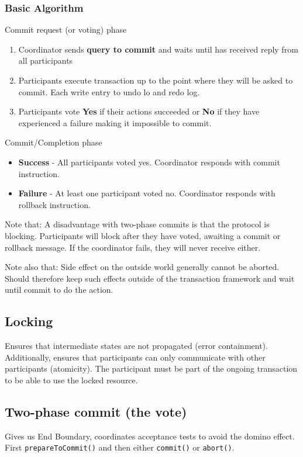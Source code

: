 \subsubsection{Basic Algorithm}
Commit request (or voting) phase 
\begin{enumerate}
\item Coordinator sends \textbf{query to commit} and waits until has received reply from all participants
\item Participants execute transaction up to the point where they will be asked to commit. Each write entry to undo lo and redo log.
\item Participants vote \textbf{Yes} if their actions succeeded or \textbf{No} if they have experienced a failure making it impossible to commit.
\end{enumerate}
Commit/Completion phase
\begin{itemize}
\item \textbf{Success} - All participants voted yes. Coordinator responds with commit instruction.
\item \textbf{Failure} - At least one participant voted no. Coordinator responds with rollback instruction.
\end{itemize}

Note that: A disadvantage with two-phase commits is that the protocol is blocking. Participants will block after they have voted, awaiting a commit or rollback
message. If the coordinator fails, they will never receive either.

Note also that: Side effect on the outside world generally cannot be aborted. Should therefore keep such effects outside of the transaction framework and wait until commit to do the action. 

\subsection{Locking}
Ensures that intermediate states are not propagated (error containment). Additionally, ensures that participants can only communicate with other participants (atomicity). The participant must be part of the ongoing transaction to be able to use the locked resource.

\subsection{Two-phase commit (the vote)}
Gives us End Boundary, coordinates acceptance tests to avoid the domino effect. First \texttt{prepareToCommit()} and then either \texttt{commit()} or \texttt{abort()}.


